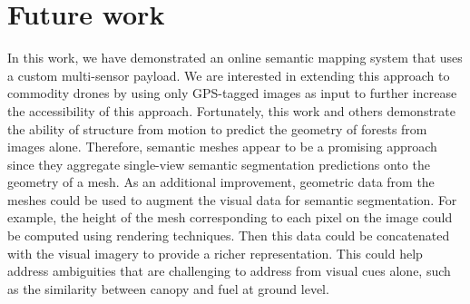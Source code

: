 
\section{Future work}
In this work, we have demonstrated an online semantic mapping system that uses a custom multi-sensor payload. We are interested in extending this approach to commodity drones by using only GPS-tagged images as input to further increase the accessibility of this approach. Fortunately, this work and others demonstrate the ability of structure from motion to predict the geometry of forests from images alone. Therefore, semantic meshes \cite{Rosu2020Semi-supervisedMeshes} appear to be a promising approach since they aggregate single-view semantic segmentation predictions onto the geometry of a mesh. As an additional improvement, geometric data from the meshes could be used to augment the visual data for semantic segmentation. For example, the height of the mesh corresponding to each pixel on the image could be computed using rendering techniques. Then this data could be concatenated with the visual imagery to provide a richer representation. This could help address ambiguities that are challenging to address from visual cues alone, such as the similarity between canopy and fuel at ground level.  


